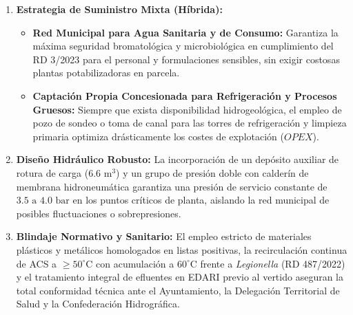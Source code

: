 \documentclass{report}
\begin{document}
\begin{enumerate}
    \item \textbf{Estrategia de Suministro Mixta (Híbrida):}
          \begin{itemize}
              \item \textbf{Red Municipal para Agua Sanitaria y de Consumo:} Garantiza la máxima seguridad bromatológica y microbiológica en cumplimiento del RD 3/2023 para el personal y formulaciones sensibles, sin exigir costosas plantas potabilizadoras en parcela.
              \item \textbf{Captación Propia Concesionada para Refrigeración y Procesos Gruesos:} Siempre que exista disponibilidad hidrogeológica, el empleo de pozo de sondeo o toma de canal para las torres de refrigeración y limpieza primaria optimiza drásticamente los costes de explotación ($OPEX$).
          \end{itemize}
    \item \textbf{Diseño Hidráulico Robusto:}
          La incorporación de un depósito auxiliar de rotura de carga ($6.6\text{ m}^3$) y un grupo de presión doble con calderín de membrana hidroneumática garantiza una presión de servicio constante de $3.5\text{ a }4.0\text{ bar}$ en los puntos críticos de planta, aislando la red municipal de posibles fluctuaciones o sobrepresiones.
    \item \textbf{Blindaje Normativo y Sanitario:}
          El empleo estricto de materiales plásticos y metálicos homologados en listas positivas, la recirculación continua de ACS a $\ge 50^\circ\text{C}$ con acumulación a $60^\circ\text{C}$ frente a \textit{Legionella} (RD 487/2022) y el tratamiento integral de efluentes en EDARI previo al vertido aseguran la total conformidad técnica ante el Ayuntamiento, la Delegación Territorial de Salud y la Confederación Hidrográfica.
\end{enumerate}

\newpage
\printbibliography[heading=bibintoc, title={Referencias Bibliográficas y Legislativas}]
\end{document}
